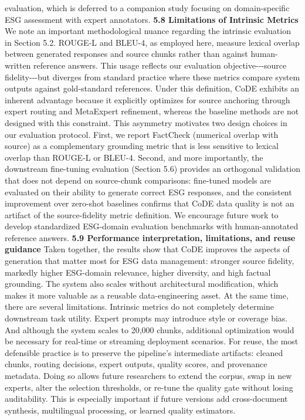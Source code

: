 \documentclass[9pt,twocolumn]{extarticle}
\begin{document}
evaluation, which is deferred to a companion study focusing on
domain-specific ESG assessment with expert annotators.
\textbf{5.8 Limitations of Intrinsic Metrics}
We note an important methodological nuance regarding the intrinsic
evaluation in Section 5.2. ROUGE-L and BLEU-4, as employed here, measure
lexical overlap between generated responses and source chunks rather
than against human-written reference answers. This usage reflects our
evaluation objective-\/-\/-source fidelity-\/-\/-but diverges from
standard practice where these metrics compare system outputs against
gold-standard references. Under this definition, CoDE exhibits an
inherent advantage because it explicitly optimizes for source anchoring
through expert routing and MetaExpert refinement, whereas the baseline
methods are not designed with this constraint.
This asymmetry motivates two design choices in our evaluation protocol.
First, we report FactCheck (numerical overlap with source) as a
complementary grounding metric that is less sensitive to lexical overlap
than ROUGE-L or BLEU-4. Second, and more importantly, the downstream
fine-tuning evaluation (Section 5.6) provides an orthogonal validation
that does not depend on source-chunk comparisons: fine-tuned models are
evaluated on their ability to generate correct ESG responses, and the
consistent improvement over zero-shot baselines confirms that CoDE data
quality is not an artifact of the source-fidelity metric definition. We
encourage future work to develop standardized ESG-domain evaluation
benchmarks with human-annotated reference answers.
\textbf{5.9 Performance interpretation, limitations, and reuse guidance}
Taken together, the results show that CoDE improves the aspects of
generation that matter most for ESG data management: stronger source
fidelity, markedly higher ESG-domain relevance, higher diversity, and
high factual grounding. The system also scales without architectural
modification, which makes it more valuable as a reusable
data-engineering asset. At the same time, there are several limitations.
Intrinsic metrics do not completely determine downstream task utility.
Expert prompts may introduce style or coverage bias. And although the
system scales to 20,000 chunks, additional optimization would be
necessary for real-time or streaming deployment scenarios.
For reuse, the most defensible practice is to preserve the pipeline's
intermediate artifacts: cleaned chunks, routing decisions, expert
outputs, quality scores, and provenance metadata. Doing so allows future
researchers to extend the corpus, swap in new experts, alter the
selection thresholds, or re-tune the quality gate without losing
auditability. This is especially important if future versions add
cross-document synthesis, multilingual processing, or learned quality
estimators.
\end{document}
